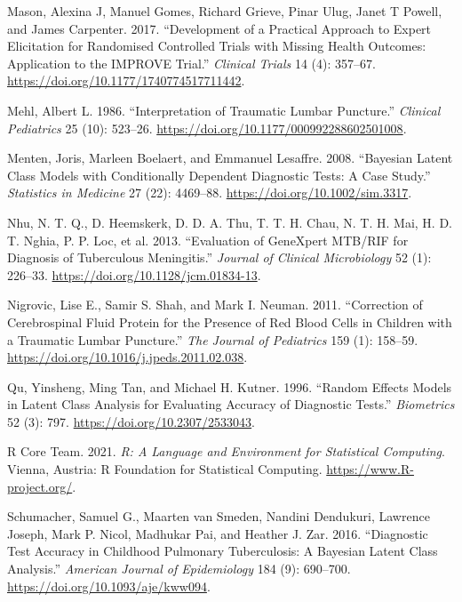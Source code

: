 \documentclass[
]{article}
\newlength{\cslhangindent}
\newlength{\cslentryspacingunit} %
\newenvironment{CSLReferences}[2] %
 {%
  \setlength{\parindent}{0pt}
  \ifodd #1
  \let\oldpar\par
  \def\par{\hangindent=\cslhangindent\oldpar}
  \fi
  \setlength{\parskip}{#2\cslentryspacingunit}
 }%
 {}
\begin{document}
\begin{CSLReferences}{1}{0}
\leavevmode{}%
Mason, Alexina J, Manuel Gomes, Richard Grieve, Pinar Ulug, Janet T Powell, and James Carpenter. 2017. {``Development of a Practical Approach to Expert Elicitation for Randomised Controlled Trials with Missing Health Outcomes: Application to the IMPROVE Trial.''} \emph{Clinical Trials} 14 (4): 357--67. \url{https://doi.org/10.1177/1740774517711442}.

\leavevmode{}%
Mehl, Albert L. 1986. {``Interpretation of Traumatic Lumbar Puncture.''} \emph{Clinical Pediatrics} 25 (10): 523--26. \url{https://doi.org/10.1177/000992288602501008}.

\leavevmode{}%
Menten, Joris, Marleen Boelaert, and Emmanuel Lesaffre. 2008. {``Bayesian Latent Class Models with Conditionally Dependent Diagnostic Tests: A Case Study.''} \emph{Statistics in Medicine} 27 (22): 4469--88. \url{https://doi.org/10.1002/sim.3317}.

\leavevmode{}%
Nhu, N. T. Q., D. Heemskerk, D. D. A. Thu, T. T. H. Chau, N. T. H. Mai, H. D. T. Nghia, P. P. Loc, et al. 2013. {``Evaluation of GeneXpert MTB/RIF for Diagnosis of Tuberculous Meningitis.''} \emph{Journal of Clinical Microbiology} 52 (1): 226--33. \url{https://doi.org/10.1128/jcm.01834-13}.

\leavevmode{}%
Nigrovic, Lise E., Samir S. Shah, and Mark I. Neuman. 2011. {``Correction of Cerebrospinal Fluid Protein for the Presence of Red Blood Cells in Children with a Traumatic Lumbar Puncture.''} \emph{The Journal of Pediatrics} 159 (1): 158--59. \url{https://doi.org/10.1016/j.jpeds.2011.02.038}.

\leavevmode{}%
Qu, Yinsheng, Ming Tan, and Michael H. Kutner. 1996. {``Random Effects Models in Latent Class Analysis for Evaluating Accuracy of Diagnostic Tests.''} \emph{Biometrics} 52 (3): 797. \url{https://doi.org/10.2307/2533043}.

\leavevmode{}%
R Core Team. 2021. \emph{R: A Language and Environment for Statistical Computing}. Vienna, Austria: R Foundation for Statistical Computing. \url{https://www.R-project.org/}.

\leavevmode{}%
Schumacher, Samuel G., Maarten van Smeden, Nandini Dendukuri, Lawrence Joseph, Mark P. Nicol, Madhukar Pai, and Heather J. Zar. 2016. {``Diagnostic Test Accuracy in Childhood Pulmonary Tuberculosis: A Bayesian Latent Class Analysis.''} \emph{American Journal of Epidemiology} 184 (9): 690--700. \url{https://doi.org/10.1093/aje/kww094}.


\end{CSLReferences}
\end{document}
